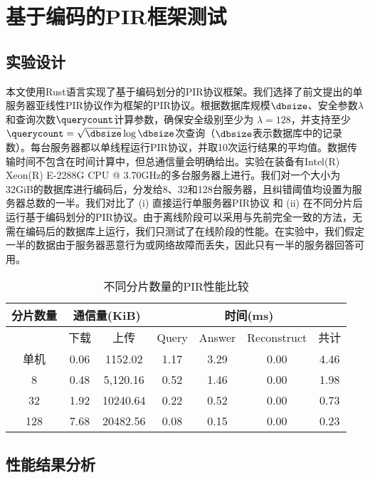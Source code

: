 \section{基于编码的PIR框架测试}
\subsection{实验设计}
本文使用Rust语言实现了基于编码划分的PIR协议框架。我们选择了前文提出的单服务器亚线性PIR协议作为框架的PIR协议。根据数据库规模$\dbsize$、安全参数$\lambda$和查询次数$\querycount$计算参数，确保安全级别至少为 $\lambda=128$，并支持至少$\querycount=\sqrt{\dbsize}\log{\dbsize}$次查询（$\dbsize$表示数据库中的记录数）。每台服务器都以单线程运行PIR协议，并取10次运行结果的平均值。数据传输时间不包含在时间计算中，但总通信量会明确给出。实验在装备有Intel(R) Xeon(R) E-2288G CPU @ 3.70GHz的多台服务器上进行。我们对一个大小为32GiB的数据库进行编码后，分发给8、32和128台服务器，且纠错阈值均设置为服务器总数的一半。我们对比了 (i) 直接运行单服务器PIR协议 和 (ii) 在不同分片后运行基于编码划分的PIR协议。由于离线阶段可以采用与先前完全一致的方法，无需在编码后的数据库上运行，我们只测试了在线阶段的性能。在实验中，我们假定一半的数据由于服务器恶意行为或网络故障而丢失，因此只有一半的服务器回答可用。

\begin{table}[]
    \caption{不同分片数量的PIR性能比较}
    \label{tab:sharded-scheme}
    \centering
    \begin{tabular}{@{}c|cc|cccc@{}}
    \toprule
    分片数量 & \multicolumn{2}{c|}{通信量(KiB)} & \multicolumn{4}{c}{时间(ms)}         \\ \midrule
         & 下载      & 上传        & Query & Answer & Reconstruct & 共计 \\ \midrule
    单机   & 0.06          & 1152.02       & 1.17  & 3.29   & 0.00        & 4.46  \\
    8    & 0.48          & 5,120.16      & 0.52  & 1.46   & 0.00        & 1.98  \\
    32   & 1.92          & 10240.64      & 0.22  & 0.52   & 0.00        & 0.73  \\
    128  & 7.68          & 20482.56      & 0.08  & 0.15   & 0.00        & 0.23  \\ \bottomrule
    \end{tabular}
\end{table}
\subsection{性能结果分析}

